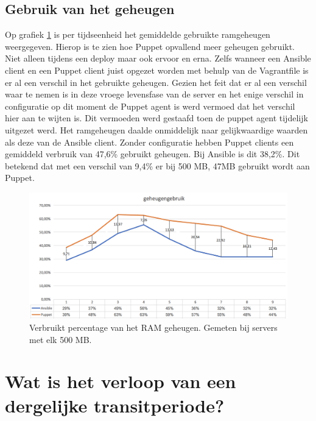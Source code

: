 \subsection{Gebruik van het geheugen}

Op grafiek \ref{fig:geheugengebruik} is per tijdseenheid het gemiddelde gebruikte ramgeheugen weergegeven. Hierop is te zien hoe Puppet opvallend meer geheugen gebruikt. Niet alleen tijdens een deploy maar ook ervoor en erna. Zelfs wanneer een Ansible client en een Puppet client juist opgezet worden met behulp van de Vagrantfile is er al een verschil in het gebruikte geheugen. Gezien het feit dat er al een verschil waar te nemen is in deze vroege levensfase van de server en het enige verschil in configuratie op dit moment de Puppet agent is werd vermoed dat het verschil hier aan te wijten is. Dit vermoeden werd gestaafd toen de puppet agent tijdelijk uitgezet werd. Het ramgeheugen daalde onmiddelijk naar gelijkwaardige waarden als deze van de Ansible client. Zonder configuratie hebben Puppet clients een gemiddeld verbruik van 47,6\% gebruikt geheugen. Bij Ansible is dit 38,2\%. Dit betekend dat met een verschil van 9,4\% er bij 500 MB, 47MB gebruikt wordt aan Puppet.


\begin{figure}
  \includegraphics[width=\linewidth]{img/geheugengebruik}
 \caption{Verbruikt percentage van het RAM geheugen. Gemeten bij servers met elk 500 MB. }  
  \label{fig:geheugengebruik}
\end{figure}



\section{Wat is het verloop van een dergelijke transitperiode?}
\label{sec:methodologie-verloop-transit}









